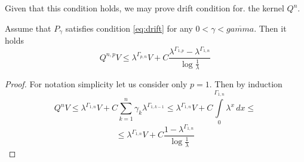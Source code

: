 \documentclass[leqno,11pt,a4paper]{article}
\begin{document}
Given that this condition holds, we may prove drift condition for. the kernel $Q^n$.
\begin{lemma} Assume that $P_{\gamma}$ satisfies condition \ref{eq:drift} for any $0 < \gamma < \overline{gamma}$. Then it holds
$$
Q^{n,p}V \leq \lambda^{\Gamma_{p,n}}V + C\frac{\lambda^{\Gamma_{1,p}} - \lambda^{\Gamma_{1,n}}}{\log{\frac{1}{\lambda}}}
$$ 
\end{lemma}
\begin{proof} For notation simplicity let us consider only $p=1$. Then by induction
$$
Q^{n}V \leq \lambda^{\Gamma_{1,n}}V + C \sum\limits_{k=1}^{n}\gamma_k \lambda^{\Gamma_{1,k-1}} \leq \lambda^{\Gamma_{1,n}}V + C \int\limits_{0}^{\Gamma_{1,n}}\lambda^{x}\,dx \leq
$$
$$
\leq \lambda^{\Gamma_{1,n}}V + C\frac{1-\lambda^{\Gamma_{1,n}}}{\log{\frac{1}{\lambda}}}
$$
\end{proof}





\end{document}
